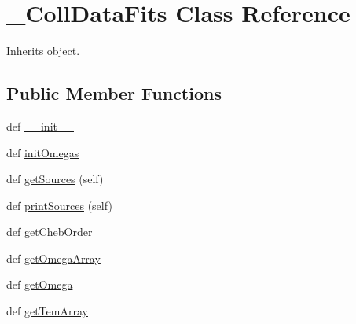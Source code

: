 \hypertarget{classpyneb_1_1core_1_1pynebcore_1_1___coll_data_fits}{}\section{\+\_\+\+Coll\+Data\+Fits Class Reference}
\label{classpyneb_1_1core_1_1pynebcore_1_1___coll_data_fits}


Inherits object.

\subsection*{Public Member Functions}
\begin{DoxyCompactItemize}
\item 
def \hyperlink{classpyneb_1_1core_1_1pynebcore_1_1___coll_data_fits_ac775ee34451fdfa742b318538164070e}{\+\_\+\+\_\+init\+\_\+\+\_\+}
\item 
def \hyperlink{classpyneb_1_1core_1_1pynebcore_1_1___coll_data_fits_a012776cf472bdbae48b49c62d738cc85}{init\+Omegas}
\item 
def \hyperlink{classpyneb_1_1core_1_1pynebcore_1_1___coll_data_fits_ada746cff051b4eefa5f61aa4ad0e7fa6}{get\+Sources} (self)
\item 
def \hyperlink{classpyneb_1_1core_1_1pynebcore_1_1___coll_data_fits_a8391e786a420d63ed15d4efd3f04aad5}{print\+Sources} (self)
\item 
def \hyperlink{classpyneb_1_1core_1_1pynebcore_1_1___coll_data_fits_a949347115a864eb62f2db4ad33406b4b}{get\+Cheb\+Order}
\item 
def \hyperlink{classpyneb_1_1core_1_1pynebcore_1_1___coll_data_fits_abe866c7263d184180cefd99da4439667}{get\+Omega\+Array}
\item 
def \hyperlink{classpyneb_1_1core_1_1pynebcore_1_1___coll_data_fits_aaf6e92dda1e6d1aa7d06098b4e9a4e6d}{get\+Omega}
\item 
def \hyperlink{classpyneb_1_1core_1_1pynebcore_1_1___coll_data_fits_a903ccea78642f5853c9a01b1616c6899}{get\+Tem\+Array}
\end{DoxyCompactItemize}
